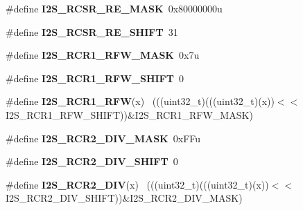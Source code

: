 \begin{DoxyCompactItemize}
\item 
\hypertarget{group___i2_s___register___masks_gad72205d781328e9b391811123b8e115f}{}\#define {\bfseries I2\+S\+\_\+\+R\+C\+S\+R\+\_\+\+R\+E\+\_\+\+M\+A\+S\+K}~0x80000000u\label{group___i2_s___register___masks_gad72205d781328e9b391811123b8e115f}

\item 
\hypertarget{group___i2_s___register___masks_gaedda1d8255b891c8abfaf0104a73e6bf}{}\#define {\bfseries I2\+S\+\_\+\+R\+C\+S\+R\+\_\+\+R\+E\+\_\+\+S\+H\+I\+F\+T}~31\label{group___i2_s___register___masks_gaedda1d8255b891c8abfaf0104a73e6bf}

\item 
\hypertarget{group___i2_s___register___masks_gaa01b4e3c93f7d6e394ae98744b23ce2e}{}\#define {\bfseries I2\+S\+\_\+\+R\+C\+R1\+\_\+\+R\+F\+W\+\_\+\+M\+A\+S\+K}~0x7u\label{group___i2_s___register___masks_gaa01b4e3c93f7d6e394ae98744b23ce2e}

\item 
\hypertarget{group___i2_s___register___masks_ga0377763c289535be469c9c34d4e5db0a}{}\#define {\bfseries I2\+S\+\_\+\+R\+C\+R1\+\_\+\+R\+F\+W\+\_\+\+S\+H\+I\+F\+T}~0\label{group___i2_s___register___masks_ga0377763c289535be469c9c34d4e5db0a}

\item 
\hypertarget{group___i2_s___register___masks_ga0049052eccf44a52981b7ebbe270d433}{}\#define {\bfseries I2\+S\+\_\+\+R\+C\+R1\+\_\+\+R\+F\+W}(x)                                                ~(((uint32\+\_\+t)(((uint32\+\_\+t)(x))$<$$<$I2\+S\+\_\+\+R\+C\+R1\+\_\+\+R\+F\+W\+\_\+\+S\+H\+I\+F\+T))\&I2\+S\+\_\+\+R\+C\+R1\+\_\+\+R\+F\+W\+\_\+\+M\+A\+S\+K)\label{group___i2_s___register___masks_ga0049052eccf44a52981b7ebbe270d433}

\item 
\hypertarget{group___i2_s___register___masks_ga2a4f6e6b8d73e0abf6f0d5b0979182e2}{}\#define {\bfseries I2\+S\+\_\+\+R\+C\+R2\+\_\+\+D\+I\+V\+\_\+\+M\+A\+S\+K}~0x\+F\+Fu\label{group___i2_s___register___masks_ga2a4f6e6b8d73e0abf6f0d5b0979182e2}

\item 
\hypertarget{group___i2_s___register___masks_gaa9a14126d11b963220e6b98c027be2e1}{}\#define {\bfseries I2\+S\+\_\+\+R\+C\+R2\+\_\+\+D\+I\+V\+\_\+\+S\+H\+I\+F\+T}~0\label{group___i2_s___register___masks_gaa9a14126d11b963220e6b98c027be2e1}

\item 
\hypertarget{group___i2_s___register___masks_ga0cdb80f6a7a3524030b9b15a1e91dd6e}{}\#define {\bfseries I2\+S\+\_\+\+R\+C\+R2\+\_\+\+D\+I\+V}(x)                                                ~(((uint32\+\_\+t)(((uint32\+\_\+t)(x))$<$$<$I2\+S\+\_\+\+R\+C\+R2\+\_\+\+D\+I\+V\+\_\+\+S\+H\+I\+F\+T))\&I2\+S\+\_\+\+R\+C\+R2\+\_\+\+D\+I\+V\+\_\+\+M\+A\+S\+K)\label{group___i2_s___register___masks_ga0cdb80f6a7a3524030b9b15a1e91dd6e}


\end{DoxyCompactItemize}
